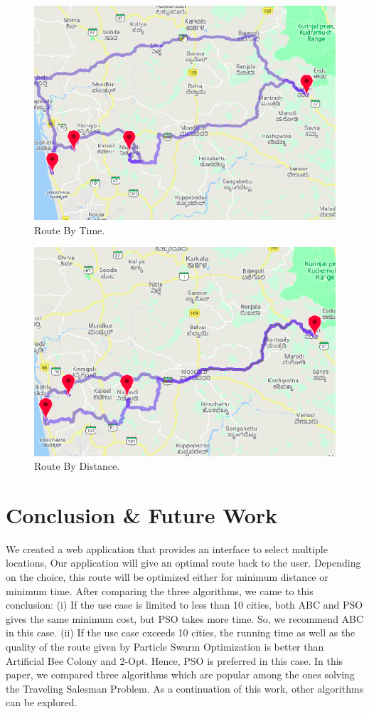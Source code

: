 \documentclass[conference]{IEEEtran}
\begin{document}
\begin{figure}[htbp]
\centerline{\includegraphics[width=\columnwidth]{distance.png}}
\caption{Route By Time.}
\label{fig5}
\end{figure}

\begin{figure}[htbp]
\centerline{\includegraphics[width=\columnwidth]{time.png}}
\caption{Route By Distance.}
\label{fig6}
\end{figure}

\section {Conclusion \& Future Work}
We created a web application that provides an interface to select multiple locations, Our application will give an optimal route back to the user. Depending on the choice, this route will be optimized either for minimum distance or minimum time. After comparing the three algorithms, we came to this conclusion: (i) If the use case is limited to less than 10 cities, both ABC and PSO gives the same minimum cost, but PSO takes more time. So, we recommend ABC in this case. (ii) If the use case exceeds 10 cities, the running time as well as the quality of the route given by Particle Swarm Optimization is better than Artificial Bee Colony and 2-Opt. Hence, PSO is preferred in this case. In this paper, we compared three algorithms which are popular among the ones solving the Traveling Salesman Problem. As a continuation of this work, other algorithms can be explored.
\end{document}
